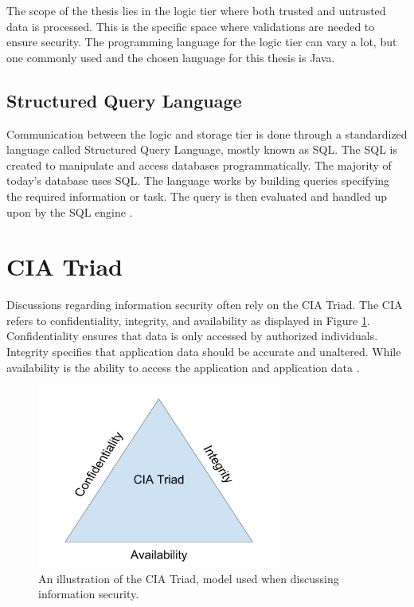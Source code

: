 The scope of the thesis lies in the logic tier where both trusted and untrusted data is processed. This is the specific space where validations are needed to ensure security. The programming language for the logic tier can vary a lot, but one commonly used and the chosen language for this thesis is Java.



\subsection{Structured Query Language}
Communication between the logic and storage tier is done through a standardized language called Structured Query Language, mostly known as SQL. The SQL is created to manipulate and access databases programmatically. The majority of today's database uses SQL. The language works by building queries specifying the required information or task. The query is then evaluated and handled up upon by the SQL engine \parencite{DarieCristian2003TPGt}.



\section{CIA Triad}
\label{cia}
Discussions regarding information security often rely on the CIA Triad. The CIA refers to confidentiality, integrity, and availability as displayed in Figure \ref{fig:CIATriad}. Confidentiality ensures that data is only accessed by authorized individuals. Integrity specifies that application data should be accurate and unaltered. While availability is the ability to access the application and application data \parencite{2014C1-W}.

\begin{figure}[H]
    \centering
    \includegraphics[height=6cm]{images/CIATriad.jpg}
    \caption{An illustration of the CIA Triad, model used when discussing information security.}
    \label{fig:CIATriad}
\end{figure}



